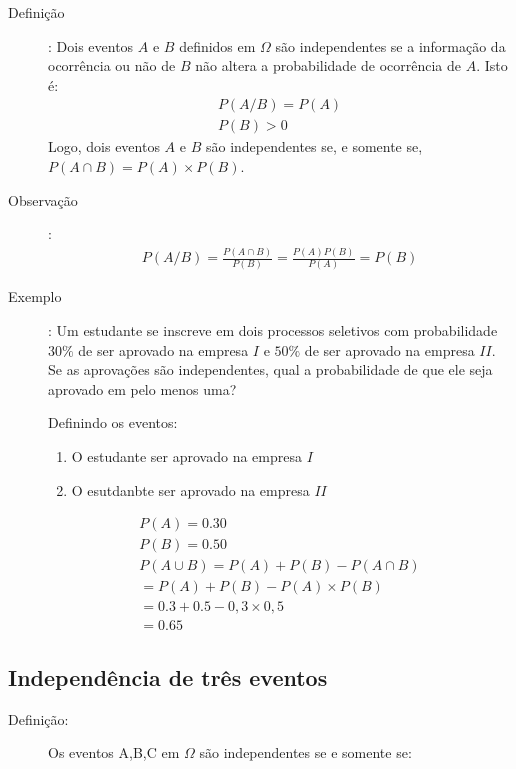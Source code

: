 \documentclass[11pt,a4paper]{book}
\begin{document}
\begin{description}
  \begin{description}
    \item [Definição]: Dois eventos $A$ e $B$ definidos em $\Omega$ são independentes se 
      a informação da ocorrência ou não de $B$ não altera a probabilidade de ocorrência
      de $A$. Isto é:
      \begin{align}
        P(A/B)= P(A) \\
        P(B)>0 
      \end{align}
      Logo, dois eventos $A$ e $B$ são independentes se, e somente se, $P(A \cap B)=P(A)\times P(B)$.
    \item [Observação]: 
      \begin{align*}
        P(A/B) = \frac{P(A \cap B)}{P(B)} = \frac{P(A)P(B)}{P(A)}= P(B)
      \end{align*}
    \item [Exemplo]: Um estudante se inscreve em dois processos seletivos com probabilidade 
      $30\%$ de ser aprovado na empresa $I$ e $50\%$ de ser aprovado na empresa $II$. Se 
      as aprovações são independentes, qual a probabilidade de que ele seja aprovado em
      pelo menos uma?

      Definindo os eventos:

      \begin{enumerate}[label=\Alph*:]
        \item  O estudante ser aprovado na empresa $I$
        \item  O esutdanbte ser aprovado na empresa $II$
      \end{enumerate}
      \begin{align*}
        P(A)= 0.30\\
        P(B)=0.50\\
        P(A\cup B)= P(A)+P(B)-P(A\cap B)\\
        =P(A)+P(B)-P(A)\times P(B)\\
        =0.3+0.5- 0,3 \times 0,5\\
        =0.65
      \end{align*}
  \end{description}
  \subsection{Independência de três eventos}

  \begin{description}
    \item [Definição:]Os eventos A,B,C em $\Omega$ são independentes se e somente se:


\end{description}
\end{description}
\end{document}
